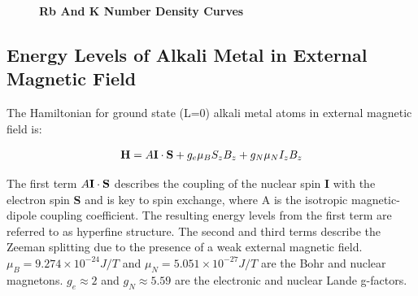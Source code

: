 \begin{figure}[t!]
	
	\centering
	\caption[Rb And K Number Density Curves]{{\bf Rb And K Number Density Curves}}
	\label{fig:AlkaliVaporDensity}
	
\end{figure}

\subsection{Energy Levels of Alkali Metal in External Magnetic Field}

The Hamiltonian for ground state (L=0) alkali metal atoms in external magnetic field is:

\begin{equation}
{\bf H} = A{\bf I \cdot S} + g_{e} \mu_{B} S_{z}B_{z} + g_{N}{\mu_{N}}I_{z}B_{z}
\end{equation}

The first term $A{\bf I \cdot S}$ describes the coupling of the nuclear spin {\bf I} with the electron spin {\bf S} and is key to spin exchange, where A is the isotropic magnetic-dipole coupling coefficient. The resulting energy levels from the first term are referred to as hyperfine structure. The second and third terms describe the Zeeman splitting due to the presence of a weak external magnetic field. ${\mu}_{B} = 9.274 \times 10^{-24}J/T$ and ${\mu}_{N} = 5.051 \times 10^{-27}J/T$ are the Bohr and nuclear magnetons. $g_{e}\approx2$ and $g_{N}\approx5.59$ are the electronic and nuclear Lande g-factors.

